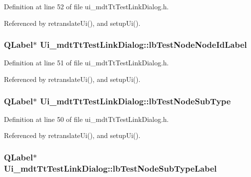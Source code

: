 Definition at line 52 of file ui\-\_\-mdt\-Tt\-Test\-Link\-Dialog.\-h.



Referenced by retranslate\-Ui(), and setup\-Ui().

\hypertarget{class_ui__mdt_tt_test_link_dialog_a214b09787cff9230414eebf4eebe7fdc}{
\subsubsection[{lb\-Test\-Node\-Node\-Id\-Label}]{\setlength{\rightskip}{0pt plus 5cm}Q\-Label$\ast$ Ui\-\_\-mdt\-Tt\-Test\-Link\-Dialog\-::lb\-Test\-Node\-Node\-Id\-Label}}\label{class_ui__mdt_tt_test_link_dialog_a214b09787cff9230414eebf4eebe7fdc}


Definition at line 51 of file ui\-\_\-mdt\-Tt\-Test\-Link\-Dialog.\-h.



Referenced by retranslate\-Ui(), and setup\-Ui().

\hypertarget{class_ui__mdt_tt_test_link_dialog_aa14fdcee18956d9e61c83eb1b3313ad8}{
\subsubsection[{lb\-Test\-Node\-Sub\-Type}]{\setlength{\rightskip}{0pt plus 5cm}Q\-Label$\ast$ Ui\-\_\-mdt\-Tt\-Test\-Link\-Dialog\-::lb\-Test\-Node\-Sub\-Type}}\label{class_ui__mdt_tt_test_link_dialog_aa14fdcee18956d9e61c83eb1b3313ad8}


Definition at line 50 of file ui\-\_\-mdt\-Tt\-Test\-Link\-Dialog.\-h.



Referenced by retranslate\-Ui(), and setup\-Ui().

\hypertarget{class_ui__mdt_tt_test_link_dialog_a4b44adc6d9fce271a5df112362050661}{
\subsubsection[{lb\-Test\-Node\-Sub\-Type\-Label}]{\setlength{\rightskip}{0pt plus 5cm}Q\-Label$\ast$ Ui\-\_\-mdt\-Tt\-Test\-Link\-Dialog\-::lb\-Test\-Node\-Sub\-Type\-Label}}\label{class_ui__mdt_tt_test_link_dialog_a4b44adc6d9fce271a5df112362050661}


